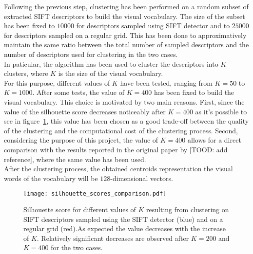 \documentclass[../main.tex]{subfiles}
\begin{document}
Following the previous step, clustering has been performed on a random subset of extracted SIFT descriptors to build the visual vocabulary. The size of the subset has been fixed to $\num{10000}$ for descriptors sampled using SIFT detector and to $\num{25000}$ for descriptors sampled on a regular grid. This has been done to approximatively maintain the same ratio between the total number of sampled descriptors and the number of descriptors used for clustering in the two cases.\\
In paticular, the  algorithm has been used to cluster the descriptors into $K$ clusters, where $K$ is the size of the visual vocabulary.\\
For this purpose, different values of $K$ have been tested, ranging from $K=50$ to $K=1000$. After some tests, the value of $K=400$ has been fixed to build the visual vocabulary. This choice is motivated by two main reasons. First, since the value of the silhouette score decreases noticeably after $K=400$ as it's possible to see in figure~\ref{fig:silhouette-score}, this value has been chosen as a good trade-off between the quality of the clustering and the computational cost of the clustering process. Second, considering the purpose of this project, the value of $K=400$ allows for a direct comparison with the results reported in the original paper by  [TOOD: add reference], where the same value has been used.\\
After the clustering process, the obtained centroids representation the visual words of the vocabulary will be $128$-dimensional vectors.


\begin{figure}[H]
  \centering
  \texttt{[image: silhouette\_scores\_comparison.pdf]}
  \caption{Silhouette score for different values of $K$ resulting from clustering on SIFT descriptors sampled using the SIFT detector (blue) and on a regular grid (red).As expected the value decreases with the increase of $K$. Relatively significant decreases are observed after $K=200$ and $K=400$ for the two cases.}
  \label{fig:silhouette-score}
\end{figure}
\end{document}

